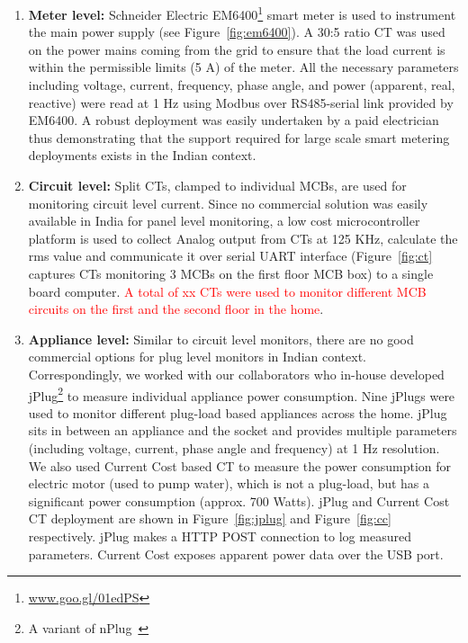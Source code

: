 \documentclass[10pt]{sensys-proc}
\newcommand{\redcolor}[1]{\textcolor{red}{#1}}
\newcommand{\figref}[1]{Figure~\ref{#1}}
\newcommand{\denselistbib}{
  \itemsep -.6pt\topsep-4pt\partopsep-20pt
}
\begin{document}
\begin{enumerate}\denselistbib
\item \textbf{Meter level:} Schneider Electric EM6400\footnote{\url{www.goo.gl/01edPS}} smart meter is used to instrument the main power supply (see \figref{fig:em6400}).%
A 30:5 ratio CT was used on the power mains coming from the grid to ensure that the load current is within the permissible limits (5 A) of the meter. All the necessary parameters including voltage, current, frequency, phase angle, and power (apparent, real, reactive) were read at 1 Hz using Modbus over RS485-serial link provided by EM6400. A robust deployment was easily undertaken by a paid electrician thus demonstrating that the support required for large scale smart metering deployments exists in the Indian context. 

\item \textbf{Circuit level:} Split CTs, clamped to individual MCBs, are used for monitoring circuit level current. Since no commercial solution was easily available in India for panel level monitoring, a low cost microcontroller platform is used to collect Analog output from CTs at 125 KHz, calculate the rms value and communicate it over serial UART interface (\figref{fig:ct} captures CTs monitoring 3 MCBs on the first floor MCB box) to a single board computer. \redcolor{A total of xx CTs were used to monitor different MCB circuits on the first and the second floor in the home}.

\item \textbf{Appliance level:} Similar to circuit level monitors, there are no good commercial options for plug level monitors in Indian context. Correspondingly, we worked with our collaborators who in-house developed jPlug\footnote{A variant of nPlug~\cite{nplug}} to measure individual appliance power consumption. Nine jPlugs were used to monitor different plug-load based appliances across the home. jPlug sits in between an appliance and the socket and provides multiple parameters (including voltage, current, phase angle and frequency) at 1 Hz resolution. We also used Current Cost based CT to measure the power consumption for electric motor (used to pump water), which is not a plug-load, but has a significant power consumption (approx. 700 Watts). jPlug and Current Cost CT deployment are shown in \figref{fig:jplug} and \figref{fig:cc} respectively. jPlug makes a HTTP POST connection to log measured parameters. Current Cost exposes apparent power data over the USB port. 
\end{enumerate}
\end{document}
